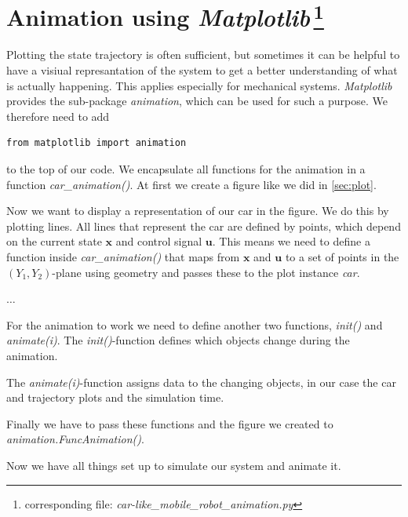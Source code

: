 \documentclass[a4paper,11pt,headings=standardclasses]{scrartcl}%
\newcommand{\mpl}{\emph{Matplotlib}\,}
\newcommand{\uu}{\mathbf{u}}
\newcommand{\x}{\mathbf{x}}
\begin{document}
\section[Animation using \mpl]{Animation using \mpl \protect \footnote{corresponding file: \emph{car-like\_mobile\_robot\_animation.py}}}
\label{sec:animation}
Plotting the state trajectory is often sufficient, but sometimes it can be helpful to have a visiual represantation of the system to get a better understanding of what is actually happening. This applies especially for mechanical systems.
\mpl provides the sub-package \emph{animation}, which can be used for such a purpose. We therefore need to add 
\begin{lstlisting}
from matplotlib import animation
\end{lstlisting}
to the top of our code. We encapsulate all functions for the animation in a function \emph{car\_animation()}. At first we create a figure like we did in \ref{sec:plot}.

Now we want to display a representation of our car in the figure. We do this by plotting lines. All lines that represent the car are defined by points, which depend on the current state $\x$ and control signal $\uu$. This means we need to define a function inside \emph{car\_animation()} that maps from $\x$ and $\uu$ to a set of points in the $(Y_1,Y_2)$-plane using geometry and passes these to the plot instance \emph{car}.

$\dots$

For the animation to work we need to define another two functions, \emph{init()} and \emph{animate(i)}. The \emph{init()}-function defines which objects change during the animation.

The \emph{animate(i)}-function assigns data to the changing objects, in our case the car and trajectory plots and the simulation time.

Finally we have to pass these functions and the figure we created to \emph{animation.FuncAnimation()}.

Now we have all things set up to simulate our system and animate it.

\end{document}
